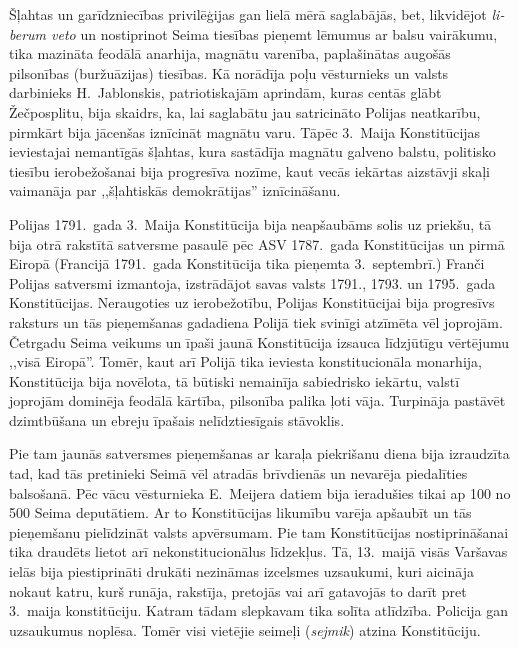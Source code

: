 \documentclass[twoside,a5paper,12pt,fleqn,openany]{extbook}
\newcommand{\pltxti}[1]{\textit{\textpolish{#1}}}
\newcommand{\latxti}[1]{\textit{\textlatin{#1}}}
\begin{document}
Šļahtas un garīdzniecības privilēģijas gan lielā mērā saglabājās, bet, likvidējot \latxti{liberum veto} un nostiprinot Seima tiesības pieņemt lēmumus ar balsu vairākumu, tika mazināta feodālā anarhija, magnātu varenība, paplašinātas augošās pilsonības (buržuāzijas) tiesības. Kā norādīja poļu vēsturnieks un valsts darbinieks H.~Jablonskis, patriotiskajām aprindām, kuras centās glābt Žečposplitu, bija skaidrs, ka, lai saglabātu jau satricināto Polijas neatkarību, pirmkārt bija jācenšas iznīcināt magnātu varu. Tāpēc 3.~Maija Konstitūcijas ieviestajai nemantīgās šļahtas, kura sastādīja magnātu galveno balstu, politisko tiesību ierobežošanai bija progresīva nozīme, kaut vecās iekārtas aizstāvji skaļi vaimanāja par ,,šļahtiskās demokrātijas'' iznīcināšanu.

Polijas 1791.~gada 3.~Maija Konstitūcija bija neapšaubāms solis uz priekšu, tā bija otrā rakstītā satversme pasaulē pēc ASV 1787.~gada Konstitūcijas un pirmā Eiropā (Francijā 1791.~gada Konstitūcija tika pieņemta 3.~septembrī.) Franči Polijas satversmi izmantoja, izstrādājot savas valsts 1791., 1793. un 1795.~gada Konstitūcijas. Neraugoties uz ierobežotību, Polijas Konstitūcijai bija progresīvs raksturs un tās pieņemšanas gadadiena Polijā tiek svinīgi atzīmēta vēl joprojām. Četrgadu Seima veikums un īpaši jaunā Konstitūcija izsauca līdzjūtīgu vērtējumu ,,visā Eiropā''. Tomēr, kaut arī Polijā tika ieviesta konstitucionāla monarhija, Konstitūcija bija novēlota, tā būtiski nemainīja sabiedrisko iekārtu, valstī joprojām dominēja feodālā kārtība, pilsonība palika ļoti vāja. Turpināja pastāvēt dzimtbūšana un ebreju īpašais nelīdztiesīgais stāvoklis.

Pie tam jaunās satversmes pieņemšanas ar karaļa piekrišanu diena bija izraudzīta tad, kad tās pretinieki Seimā vēl atradās brīvdienās un nevarēja piedalīties balsošanā. Pēc vācu vēsturnieka E.~Meijera datiem bija ieradušies tikai ap 100 no 500 Seima deputātiem. Ar to Konstitūcijas likumību varēja apšaubīt un tās pieņemšanu pielīdzināt valsts apvērsumam. Pie tam Konstitūcijas nostiprināšanai tika draudēts lietot arī nekonstitucionālus līdzekļus. Tā, 13.~maijā visās Varšavas ielās bija piestiprināti drukāti nezināmas izcelsmes uzsaukumi, kuri aicināja nokaut katru, kurš runāja, rakstīja, pretojās vai arī gatavojās to darīt pret 3.~maija konstitūciju. Katram tādam slepkavam tika solīta atlīdzība. Policija gan uzsaukumus noplēsa. Tomēr visi vietējie seimeļi (\pltxti{sejmik}) atzina Konstitūciju.
\end{document}
